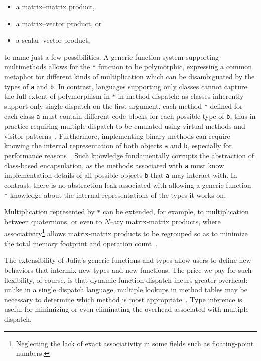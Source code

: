 \documentclass[pldi]{sigplanconf-pldi15}
\begin{document}
\begin{itemize}
	\item a matrix--matrix product,
	\item a matrix--vector product, or
	\item a scalar--vector product,
\end{itemize}
%
to name just a few possibilities. A generic function system supporting
multimethods allows for the \verb|*| function to be polymorphic, expressing a
common metaphor for different kinds of multiplication which can be
disambiguated by the types of \verb|a| and \verb|b|. In contrast, languages
supporting only classes cannot capture the full extent of polymorphism in
\verb|*| in method dispatch: as classes inherently support only single dispatch
on the first argument, each method \verb|*| defined for each class \verb|a|
must contain different code blocks for each possible type of \verb|b|, thus in
practice requiring multiple dispatch to be emulated using virtual methods and
visitor patterns~\cite{designpatterns}. Furthermore, implementing binary methods can
require knowing the internal representation of both objects \verb|a| and
\verb|b|, especially for performance reasons~\cite{Bruce1995}. Such knowledge
fundamentally corrupts the abstraction of class-based encapsulation, as the
methods associated with \verb|a| must know implementation details of all
possible objects \verb|b| that \verb|a| may interact with.
In contrast, there is no abstraction leak associated with allowing a generic
function \verb|*| knowledge about the internal representations of the types it
works on.

Multiplication represented by \verb|*| can be extended, for
example, to multiplication between quaternions, or even to $N$--ary
matrix-matrix products, where associativity\footnote{Neglecting the lack of
exact associativity in some fields such as floating-point numbers.} allows
matrix-matrix products to be regrouped so as to minimize the total memory
footprint and operation count~\cite{Hu1984}.

The extensibility of Julia's generic functions and types allow users to
define new behaviors that intermix new types and new functions. The price we pay
for such flexibility, of course, is that dynamic function dispatch incurs
greater overhead: unlike in a single dispatch language, multiple lookups in
method tables may be necessary to determine which method is most
appropriate~\cite{Bruce1995}. Type inference is
useful for minimizing or even eliminating the
overhead associated with multiple dispatch.
\end{document}
